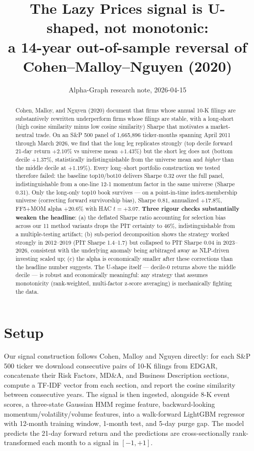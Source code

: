 \documentclass[11pt]{article}
\title{The Lazy Prices signal is U-shaped, not monotonic:\\
  a 14-year out-of-sample reversal of Cohen--Malloy--Nguyen (2020)}
\author{Alpha-Graph research note, 2026-04-15}
\date{}
\begin{document}
\maketitle

\begin{abstract}
Cohen, Malloy, and Nguyen (2020) document that firms whose annual 10-K filings
are substantively rewritten underperform firms whose filings are stable, with
a long-short (high cosine similarity minus low cosine similarity) Sharpe that
motivates a market-neutral trade. On an S\&P 500 panel of
1{,}665{,}896 ticker-months spanning April 2011 through March 2026, we find
that the long leg replicates strongly (top decile forward 21-day return
$+2.10\%$ vs universe mean $+1.43\%$) but the short leg does not (bottom
decile $+1.37\%$, statistically indistinguishable from the universe mean
and \emph{higher} than the middle decile at $+1.19\%$). Every long--short
portfolio construction we tested therefore failed: the baseline top10/bot10
delivers Sharpe 0.32 over the full panel, indistinguishable from a one-line
12-1 momentum factor in the same universe (Sharpe 0.31). Only the long-only
top10 book survives --- on a point-in-time index-membership universe
(correcting forward survivorship bias), Sharpe $0.81$, annualized $+17.8\%$,
FF5+MOM alpha $+20.6\%$ with HAC $t = +3.07$. \textbf{Three rigour checks
substantially weaken the headline}: (a) the deflated Sharpe ratio
\citep{bailey2014} accounting for selection bias across our 11 method
variants drops the PIT certainty to 46\%, indistinguishable from a
multiple-testing artifact; (b) sub-period decomposition shows the strategy
worked strongly in 2012--2019 (PIT Sharpe 1.4--1.7) but collapsed to PIT
Sharpe 0.04 in 2023--2026, consistent with the underlying anomaly being
arbitraged away as NLP-driven investing scaled up; (c) the alpha is
economically smaller after these corrections than the headline number
suggests. The U-shape itself --- decile-0 returns above the middle decile ---
is robust and economically meaningful:
any strategy that assumes monotonicity (rank-weighted, multi-factor z-score
averaging) is mechanically fighting the data.
\end{abstract}

\section{Setup}

Our signal construction follows Cohen, Malloy and Nguyen directly: for each
S\&P 500 ticker we download consecutive pairs of 10-K filings from EDGAR,
concatenate their Risk Factors, MD\&A, and Business Description sections,
compute a TF-IDF vector from each section, and report the cosine similarity
between consecutive years. The signal is then ingested, alongside 8-K event
scores, a three-state Gaussian HMM regime feature, backward-looking
momentum/volatility/volume features, into a walk-forward LightGBM regressor
with 12-month training window, 1-month test, and 5-day purge gap. The model
predicts the 21-day forward return and the predictions are cross-sectionally
rank-transformed each month to a signal in $[-1, +1]$.
\end{document}
